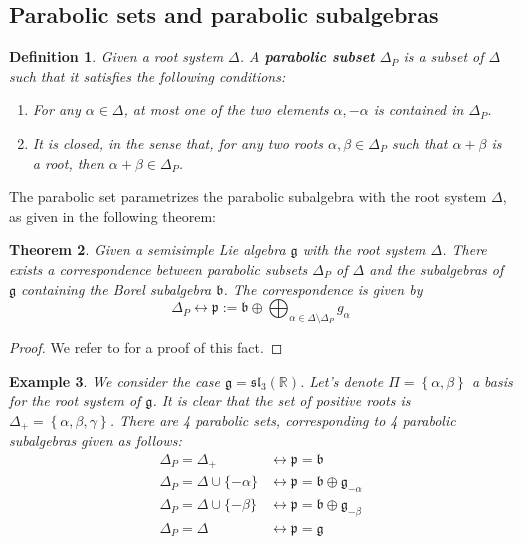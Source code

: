 \documentclass[12pt]{article} %
\newtheorem{definition}{Definition}[section]
\newtheorem{theorem}[definition]{Theorem}
\newtheorem{example}[definition]{Example}
\begin{document}
\subsection{Parabolic sets and parabolic subalgebras}
\begin{definition}
    Given a root system $\Delta$. A \textbf{parabolic subset} $\Delta_P$ is a subset of $\Delta$ such that
    it satisfies the following conditions:
    \begin{enumerate}
        \item For any $\alpha \in \Delta$, at most one of the two elements $\alpha, - \alpha$ is contained in $\Delta_P$.
        \item It is closed, in the sense that, for any two roots $\alpha,\beta \in \Delta_P$ such that $\alpha+\beta$ is a root, then $\alpha+\beta \in \Delta_P$.
    \end{enumerate}
\end{definition}
The parabolic set parametrizes the parabolic subalgebra with the root system $\Delta$, as given in the following theorem:
\begin{theorem}
    Given a semisimple Lie algebra $\mathfrak{g}$ with the root system $\Delta$. There exists a correspondence between
    parabolic subsets $\Delta_P$ of $\Delta$ and the subalgebras of $\mathfrak{g}$ containing the
    Borel subalgebra $\mathfrak{b}$. The correspondence is given by
    \[ \Delta_P \longleftrightarrow \mathfrak{p}:= \mathfrak{b}\oplus \bigoplus_{\alpha \in \Delta \setminus \Delta_P} g_{\alpha}\]
\end{theorem}
\begin{proof}
    We refer to \cite{} for a proof of this fact.
\end{proof}
\begin{example}
    We consider the case $\mathfrak{g} = \mathfrak{sl}_3(\mathbb{R})$. Let's denote
    $\Pi = \left\lbrace \alpha,\beta\right\rbrace$ a basis for the root system of $\mathfrak{g}$. It is clear that
    the set of positive roots is $\Delta_+=\left\lbrace \alpha,\beta,\gamma \right\rbrace$. There are
    4 parabolic sets, corresponding to 4 parabolic subalgebras given as follows:
    \begin{align*}
        \Delta_P = \Delta_+                 & \longleftrightarrow \mathfrak{p} = \mathfrak{b}                               \\
        \Delta_{P} =\Delta \cup \{-\alpha\} & \longleftrightarrow \mathfrak{p} = \mathfrak{b} \oplus \mathfrak{g}_{-\alpha} \\
        \Delta_{P}= \Delta \cup \{-\beta\}  & \longleftrightarrow \mathfrak{p} = \mathfrak{b} \oplus \mathfrak{g}_{-\beta}  \\
        \Delta_P= \Delta                    & \longleftrightarrow \mathfrak{p} = \mathfrak{g}
    \end{align*}
\end{example}
\end{document}
